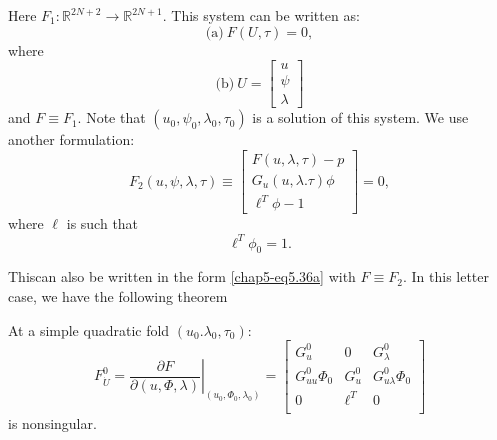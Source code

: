 Here $F_1: \mathbb{R}^{2N+2} \to \mathbb{R}^{2N+1}$. This system can
be written as: 
\begin{equation*}
\text{(a)}~ F(U, \tau )=0,\tag{5.36}\label{chap5-eq5.36a}
\end{equation*}
where
\begin{equation*}
\text{(b)}~ U= \begin{bmatrix}
u\\ \psi \\ \lambda
\end{bmatrix}
\tag{5.36}\label{chap5-eq5.36b}
\end{equation*}
and $F \equiv F_1$. Note that $(u_0, \psi_0, \lambda_0, \tau_0)$ is a
solution of this system. We use another formulation: 
\begin{equation*}
F_2(u, \psi , \lambda, \tau) \equiv
\begin{bmatrix}
F(u, \lambda, \tau)-p \\
 G_u(u, \lambda. \tau)\phi \\ 
\ell^T\phi-1
\end{bmatrix}=0,\tag{5.37a}\label{chap5-eq5.37a}
\end{equation*}
where $\ell$ is such that
\begin{equation*}
\ell^T \phi_0=1. \tag{5.37b}\label{chap5-eq5.37b}
\end{equation*}

This\pageoriginale can also be written in the form \eqref{chap5-eq5.36a} with $F
\equiv F_2$. In this letter case, we have the following theorem 

\setcounter{chapthm}{37}
\begin{chapthm}\label{chap5-thm5.38} %
At a simple quadratic fold $(u_0. \lambda_0, \tau _0)$:
$$ 
\left. F_{\dot{U}}^{0}= \frac{\partial F}{\partial (u, \Phi , \lambda)}
\right|_{(u_0, \Phi_0,\lambda_0)}= 
\begin{bmatrix}
 G_u^{0} & 0 &G_{\lambda}^{0}\\
 G^{0}_{uu}\Phi _0 & G_u^{0} & G^{0}_{u \lambda} \Phi _0\\
0 & \ell^T & 0\\
\end{bmatrix}
$$
is nonsingular.
\end{chapthm}

